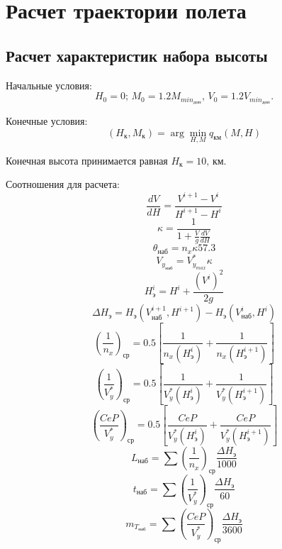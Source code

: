 \chapter{Расчет траектории полета}

\section{Расчет характеристик набора высоты}\label{sec:climb}
Начальные условия:
\[
    H_0 = 0;\, M_0 = 1.2 M_{{min}_{доп}},\,V_0 = 1.2 V_{{min}_{доп}}.
\]

Конечные условия: 
\[
    (H_к, M_к) = \arg \min_{H, M} q_{км} (M, H)
\]

Конечная высота принимается равная $H_к = 10, \, \text{км}$.

Соотношения для расчета:
\begin{equation}
    \frac{dV}{dH} = \frac{V^{i + 1} - V^i}{H^{i + 1} - H^i}
\end{equation}
\begin{equation}
    \kappa = \frac{1}{1 + \frac{V}{g} \frac{d {V}}{d {H}}}
\end{equation}
\begin{equation}
    \theta_{наб} = n_x \kappa 57.3
\end{equation}
\begin{equation}
    V_{y_{наб}} = V_{y_{max}}^* \kappa
\end{equation}
\begin{equation}
    H_э^i = H^i + \frac{(V^i)^2}{2g}
\end{equation}
\begin{equation}
    \Delta H_э = H_э (V_{наб}^{i+1}, H^{i+1}) - H_э (V_{наб}^{i}, H^{i})
\end{equation}
\begin{equation}
    \left( \frac{1}{n_x} \right)_{ср}  = 0.5 \left[ \frac{1}{n_x(H_э^i)} + \frac{1}{n_x(H_э^{i+1})} \right] 
\end{equation}
\begin{equation}
    \left( \frac{1}{V_y^*} \right)_{ср}  = 0.5 \left[ \frac{1}{V_y^*(H_э^i)} + \frac{1}{V_y^*(H_э^{i+1})} \right] 
\end{equation}
\begin{equation}
    \left( \frac{CeP}{V_y^*} \right)_{ср}  = 0.5 \left[ \frac{CeP}{V_y^*(H_э^i)} + \frac{CeP}{V_y^*(H_э^{i+1})} \right] 
\end{equation}
\begin{equation}
    L_{наб} = \sum \left( \frac{1}{n_x} \right)_{ср} \frac{\Delta H_{э}}{1000}
\end{equation}
\begin{equation}
    t_{наб} = \sum \left( \frac{1}{V_y^*} \right)_{ср} \frac{\Delta H_{э}}{60}
\end{equation}
\begin{equation}
    m_{T_{наб}} = \sum \left( \frac{CeP}{V_y^*} \right)_{ср} \frac{\Delta H_{э}}{3600}
\end{equation}


